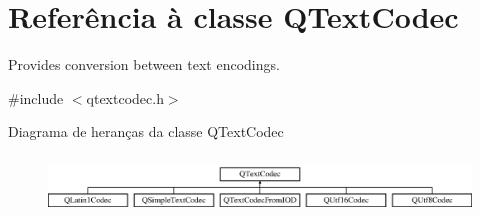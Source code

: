 \hypertarget{class_q_text_codec}{\section{Referência à classe Q\-Text\-Codec}
\label{class_q_text_codec}
}


Provides conversion between text encodings.  




{\ttfamily \#include $<$qtextcodec.\-h$>$}

Diagrama de heranças da classe Q\-Text\-Codec\begin{figure}[H]
\begin{center}
\leavevmode
\includegraphics[height=1.588652cm]{class_q_text_codec}
\end{center}
\end{figure}

